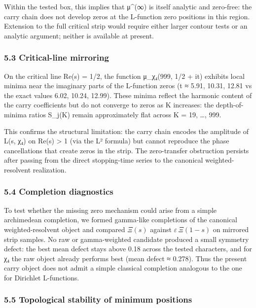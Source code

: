 \documentclass[
  11pt,
]{article}
\begin{document}
Within the tested box, this implies that μ\^{}(∞) is itself analytic and
zero-free: the carry chain does not develop zeros at the L-function zero
positions in this region. Extension to the full critical strip would require
either larger contour tests or an analytic argument; neither is available at
present.

\subsubsection{5.3 Critical-line mirroring}\label{critical-line-mirroring}

On the critical line Re(s) = 1/2, the function \textbar μ\_χ₄(999, 1/2 +
it)\textbar{} exhibits local minima near the imaginary parts of the L-function
zeros (t ≈ 5.91, 10.31, 12.81 vs the exact values 6.02, 10.24, 12.99). These
minima reflect the harmonic content of the carry coefficients but do not
converge to zeros as K increases: the depth-of-minima ratios S\_j(K) remain
approximately flat across K = 19, \ldots, 999.

This confirms the structural limitation: the carry chain encodes the amplitude
of L(s, χ₄) on Re(s) \textgreater{} 1 (via the L² formula) but cannot reproduce
the phase cancellations that create zeros in the strip. The zero-transfer
obstruction persists after passing from the direct stopping-time series to the
canonical weighted-resolvent realization.

\subsubsection{5.4 Completion diagnostics}\label{completion-diagnostics}

To test whether the missing zero mechanism could arise from a simple archimedean
completion, we formed gamma-like completions of the canonical weighted-resolvent
object and compared \(\Xi(s)\) against \(\varepsilon\,\Xi(1-s)\) on mirrored
strip samples. No raw or gamma-weighted candidate produced a small symmetry
defect: the best mean defect stays above 0.18 across the tested characters, and
for χ₄ the raw object already performs best (mean defect ≈ 0.278). Thus the
present carry object does not admit a simple classical completion analogous to
the one for Dirichlet L-functions.

\subsubsection{5.5 Topological stability of minimum
positions}\label{topological-stability-of-minimum-positions}
\end{document}
